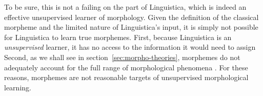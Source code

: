 To be sure, this is not a failing on the 
part of Linguistica, which is indeed an effective 
unsupervised learner of morphology. Given the definition 
of the classical morpheme and the limited nature of 
Linguistica's input, it is simply not possible for 
Linguistica to learn true morphemes. First, because 
Linguistica is an \emph{unsupervised} learner, it has 
no access to the information it would need to assign 
Second, as we shall see in section~\ref{sec:morpho-theories}, morphemes do not adequately 
account for the full range of morphological phenomena \citep{anderson:2017}. 
For these reasons, morphemes are not reasonable 
targets of unsupervised morphological learning.




